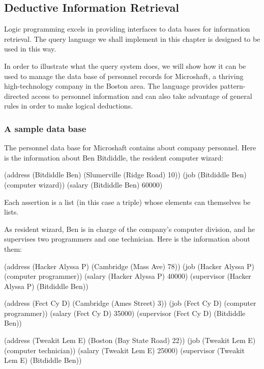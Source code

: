 \subsection{Deductive Information Retrieval}
\label{Section 4.4.1}

Logic programming excels in providing interfaces to data bases for information
retrieval.  The query language we shall implement in this chapter is designed
to be used in this way.

In order to illustrate what the query system does, we will show how it can be
used to manage the data base of personnel records for Microshaft, a thriving
high-technology company in the Boston area.  The language provides
pattern-directed access to personnel information and can also take advantage of
general rules in order to make logical deductions.

\subsubsection*{A sample data base}

The personnel data base for Microshaft contains  about
company personnel.  Here is the information about Ben Bitdiddle, the resident
computer wizard:

\begin{codeBlock}
(address (Bitdiddle Ben) (Slumerville (Ridge Road) 10))
(job (Bitdiddle Ben) (computer wizard))
(salary (Bitdiddle Ben) 60000)
\end{codeBlock}

\noindent
Each assertion is a list (in this case a triple) whose elements can themselves
be lists.

As resident wizard, Ben is in charge of the company's computer division, and he
supervises two programmers and one technician.  Here is the information about
them:

\begin{codeBlock}
(address (Hacker Alyssa P) (Cambridge (Mass Ave) 78))
(job (Hacker Alyssa P) (computer programmer))
(salary (Hacker Alyssa P) 40000)
(supervisor (Hacker Alyssa P) (Bitdiddle Ben))

(address (Fect Cy D) (Cambridge (Ames Street) 3))
(job (Fect Cy D) (computer programmer))
(salary (Fect Cy D) 35000)
(supervisor (Fect Cy D) (Bitdiddle Ben))

(address (Tweakit Lem E) (Boston (Bay State Road) 22))
(job (Tweakit Lem E) (computer technician))
(salary (Tweakit Lem E) 25000)
(supervisor (Tweakit Lem E) (Bitdiddle Ben))
\end{codeBlock}

